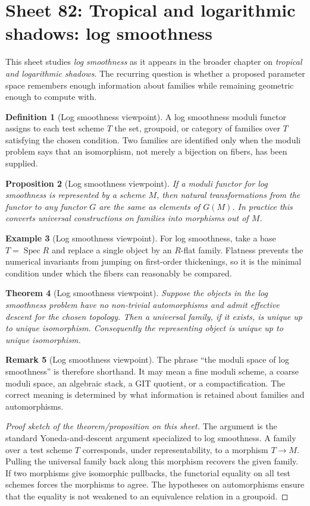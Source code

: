 \documentclass[11pt]{amsart}
\newtheorem{theorem}{Theorem}[section]
\newtheorem{proposition}[theorem]{Proposition}
\theoremstyle{definition}
\newtheorem{definition}[theorem]{Definition}
\newtheorem{example}[theorem]{Example}
\newtheorem{remark}[theorem]{Remark}
\newcommand{\Spec}{\operatorname{Spec}}
\begin{document}
\section{Sheet 82: Tropical and logarithmic shadows: log smoothness}
This sheet studies \emph{log smoothness} as it appears in the broader chapter on \emph{tropical and logarithmic shadows}.  The recurring question is whether a proposed parameter space remembers enough information about families while remaining geometric enough to compute with.
\begin{definition}[Log smoothness viewpoint]
A log smoothness moduli functor assigns to each test scheme $T$ the set, groupoid, or category of families over $T$ satisfying the chosen condition.  Two families are identified only when the moduli problem says that an isomorphism, not merely a bijection on fibers, has been supplied.
\end{definition}
\begin{proposition}[Log smoothness viewpoint]
If a moduli functor for log smoothness is represented by a scheme $M$, then natural transformations from the functor to any functor $G$ are the same as elements of $G(M)$.  In practice this converts universal constructions on families into morphisms out of $M$.
\end{proposition}
\begin{example}[Log smoothness viewpoint]
For log smoothness, take a base $T=\Spec R$ and replace a single object by an $R$-flat family.  Flatness prevents the numerical invariants from jumping on first-order thickenings, so it is the minimal condition under which the fibers can reasonably be compared.
\end{example}
\begin{theorem}[Log smoothness viewpoint]
Suppose the objects in the log smoothness problem have no non-trivial automorphisms and admit effective descent for the chosen topology.  Then a universal family, if it exists, is unique up to unique isomorphism.  Consequently the representing object is unique up to unique isomorphism.
\end{theorem}
\begin{remark}[Log smoothness viewpoint]
The phrase ``the moduli space of log smoothness'' is therefore shorthand.  It may mean a fine moduli scheme, a coarse moduli space, an algebraic stack, a GIT quotient, or a compactification.  The correct meaning is determined by what information is retained about families and automorphisms.
\end{remark}
\begin{proof}[Proof sketch of the theorem/proposition on this sheet]
The argument is the standard Yoneda-and-descent argument specialized to log smoothness.  A family over a test scheme $T$ corresponds, under representability, to a morphism $T\to M$.  Pulling the universal family back along this morphism recovers the given family.  If two morphisms give isomorphic pullbacks, the functorial equality on all test schemes forces the morphisms to agree.  The hypotheses on automorphisms ensure that the equality is not weakened to an equivalence relation in a groupoid.
\end{proof}
\end{document}

